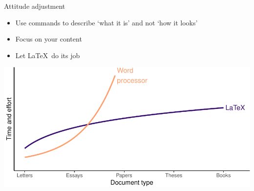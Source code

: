 \documentclass[,aspectratio=43]{beamer}
\begin{document}
\begin{frame}{Attitude adjustment}
\protect\hypertarget{attitude-adjustment}{}
\begin{itemize}
\item
  Use commands to describe `what it is' and not `how it looks'
\item
  Focus on your content
\item
  Let \LaTeX~do its job
\end{itemize}

\vspace{0.5em}

\begin{center}\includegraphics[width=1\linewidth]{figure/latexgraph-1} \end{center}
\end{frame}
\end{document}
